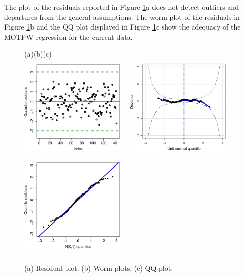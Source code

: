 \documentclass[12pt]{article}
\begin{document}
The plot of the residuals reported in Figure \ref{graf_res_quantile_aplicacao_2}a does not detect outliers and departures
from the general assumptions. The worm plot \citep{Buuren2001} of the residuals in Figure \ref{graf_res_quantile_aplicacao_2}b
and the QQ plot displayed in Figure \ref{graf_res_quantile_aplicacao_2}c show the adequacy of the MOTPW regression
for the current data.
		
		\begin{figure}[!htb]
			\begin{center}
				(a)\hspace{4.5cm}(b)\hspace{4.5cm}(c)\\					
				\includegraphics[width=5cm,height=5cm]{Res_quantilico_vs_indices.eps}
				~~\includegraphics[width=5cm,height=5cm]{wormplot.eps}
                ~~\includegraphics[width=5cm,height=5cm]{qqnorm.eps}
				\caption{(a) Residual plot. (b) Worm plots. (c) QQ plot.}
				\label{graf_res_quantile_aplicacao_2}
			\end{center}
		\end{figure}
\end{document}

